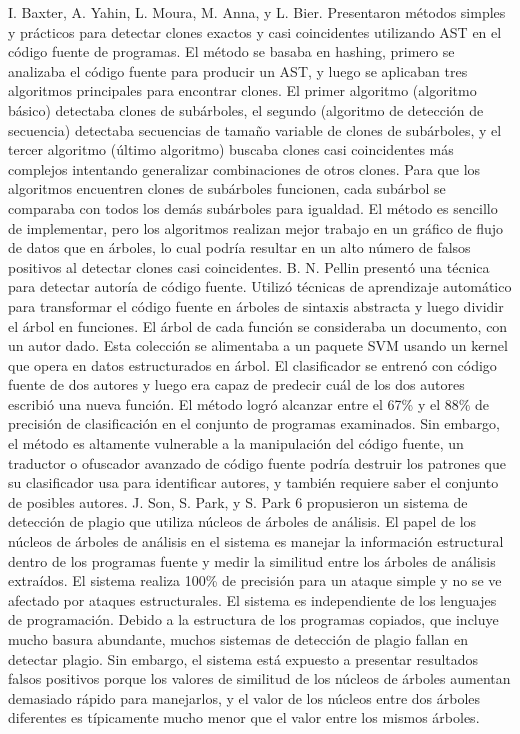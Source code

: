 I. Baxter, A. Yahin, L. Moura, M. Anna, y L. Bier. Presentaron métodos simples y prácticos para detectar clones exactos y casi coincidentes utilizando AST en el código fuente de programas. El método se basaba en hashing, primero se analizaba el código fuente para producir un AST, y luego se aplicaban tres algoritmos principales para encontrar clones. El primer algoritmo (algoritmo básico) detectaba clones de subárboles, el segundo (algoritmo de detección de secuencia) detectaba secuencias de tamaño variable de clones de subárboles, y el tercer algoritmo (último algoritmo) buscaba clones casi coincidentes más complejos intentando generalizar combinaciones de otros clones. Para que los algoritmos encuentren clones de subárboles funcionen, cada subárbol se comparaba con todos los demás subárboles para igualdad. El método es sencillo de implementar, pero los algoritmos realizan mejor trabajo en un gráfico de flujo de datos que en árboles, lo cual podría resultar en un alto número de falsos positivos al detectar clones casi coincidentes.
 B. N. Pellin presentó una técnica para detectar autoría de código fuente. Utilizó técnicas de aprendizaje automático para transformar el código fuente en árboles de sintaxis abstracta y luego dividir el árbol en funciones. El árbol de cada función se consideraba un documento, con un autor dado. Esta colección se alimentaba a un paquete SVM usando un kernel que opera en datos estructurados en árbol. El clasificador se entrenó con código fuente de dos autores y luego era capaz de predecir cuál de los dos autores escribió una nueva función. El método logró alcanzar entre el 67\% y el 88\% de precisión de clasificación en el conjunto de programas examinados. Sin embargo, el método es altamente vulnerable a la manipulación del código fuente, un traductor o ofuscador avanzado de código fuente podría destruir los patrones que su clasificador usa para identificar autores, y también requiere saber el conjunto de posibles autores.
 J. Son, S. Park, y S. Park 6 propusieron un sistema de detección de plagio que utiliza núcleos de árboles de análisis. El papel de los núcleos de árboles de análisis en el sistema es manejar la información estructural dentro de los programas fuente y medir la similitud entre los árboles de análisis extraídos. El sistema realiza 100\% de precisión para un ataque simple y no se ve afectado por ataques estructurales. El sistema es independiente de los lenguajes de programación. Debido a la estructura de los programas copiados, que incluye mucho basura abundante, muchos sistemas de detección de plagio fallan en detectar plagio. Sin embargo, el sistema está expuesto a presentar resultados falsos positivos porque los valores de similitud de los núcleos de árboles aumentan demasiado rápido para manejarlos, y el valor de los núcleos entre dos árboles diferentes es típicamente mucho menor que el valor entre los mismos árboles. \cite{smith2020enhanced}

